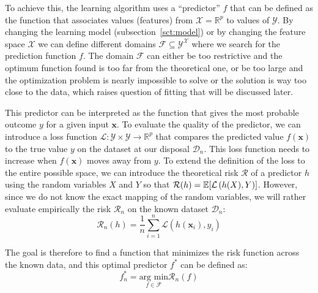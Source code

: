 \documentclass[main]{subfiles}
\begin{document}
To achieve this, the learning algorithm uses a ``predictor'' $f$ that can be defined as the function that associates values (features) from $\mathcal{X}=\mathbb{R}^{p}$ to values of $\mathcal{Y}$. By changing the learning model (subsection~\ref{sct:model}) or by changing the feature space $\mathcal{X}$ we can define different domains $\mathcal{F}\subseteq{\mathcal{Y}}^{\mathcal{X}}$ where we search for the prediction function $f$. The domain $\mathcal{F}$ can either be too restrictive and the optimum function found is too far from the theoretical one, or be too large and the optimization problem is nearly impossible to solve or the solution is way too close to the data, which raises question of fitting that will be discussed later.

This predictor can be interpreted as the function that gives the most probable outcome $y$ for a given input $\mathbf{x}$. To evaluate the quality of the predictor, we can introduce a loss function $\mathcal{L}:\mathcal{Y}\times\mathcal{Y} \rightarrow \mathbb{R}^{p}$ that compares the predicted value $f(\mathbf{x})$ to the true value $y$ on the dataset at our disposal $\mathcal{D}_{n}$. This loss function needs to increase when $f(\mathbf{x})$ moves away from $y$. To extend the definition of the loss to the entire possible space, we can introduce the theoretical risk $\mathcal{R}$ of a predictor $h$ using the random variables $X$ and $Y$ so that $\mathcal{R}(h) = \mathbb{E}{\left[\mathcal{L}\left(h(X),Y\right)\right]}$. However, since we do not know the exact mapping of the random variables, we will rather evaluate empirically the risk $\mathcal{R}_n$ on the known dataset $\mathcal{D}_{n}$:
\begin{equation}\label{eq:risk}
  \mathcal{R}_n(h) = \frac{1}{n}\sum_{i=1}^n \mathcal{L}\left(h(\mathbf{x}_i),y_i\right)
\end{equation}

The goal is therefore to find a function that minimizes the risk function across the known data, and this optimal predictor $f^*$ can be defined as:
\begin{equation}\label{eq:min_f}
  f_n^* = \underset{f\in\mathcal{F}}{\text{arg min}} \mathcal{R}_n(f)
\end{equation}
\end{document}
